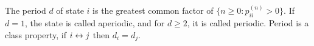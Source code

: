  The period $d$ of state $i$ is the greatest common factor of $\{n \ge 0 : p^{(n)}_{ii} > 0 \}$. If $d = 1$, the state is called aperiodic, and for $d \ge 2$, it is called periodic.
 Period is a class property, if $i \leftrightarrow j$ then $d_i = d_j$.